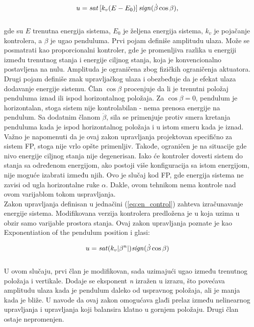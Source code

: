 \documentclass[a4paper,11pt]{article}
\theoremstyle{definition} \newtheorem{deff}{Definicija}[section]
\theoremstyle{definition} \newtheorem{prim}[deff]{Primer}
\theoremstyle{plain} \newtheorem{teor}[deff]{Teorema}
\begin{document}
	\begin{equation}
		u = \text{\textit{sat}}\left[k_v (E - E_0)\right] \text{\textit{sign}}( \dot{\beta} \cos \beta), 
		\label{eq:en_control}
	\end{equation} \\
	
	
	gde su $\textit{E}$ trenutna energija sistema, 
	$\textit{E}_0$ je željena energija sistema, $\textit{k}_v$ je pojačanje kontrolera, a $\beta$ je ugao penduluma. Prvi pojam definiše amplitudu ulaza. Može se posmatrati kao proporcionalni kontroler, gde je promenljiva razlika u energiji između trenutnog stanja i energije ciljnog stanja, koja je konvencionalno postavljena na nulu. Amplituda je ograničena zbog fizičkih ograničenja aktuatora. Drugi pojam definiše znak upravljačkog ulaza i obezbeđuje da je efekat ulaza dodavanje energije sistemu. Član $\cos \beta$ procenjuje da li je trenutni položaj penduluma iznad ili ispod horizontalnog položaja. Za $\cos \beta = 0$, pendulum je horizontalan, stoga sistem nije kontrolabilan - nema prenosa energije na pendulum. Sa dodatnim članom $\dot{\beta}$, sila se primenjuje protiv smera kretanja penduluma kada je ispod horizontalnog položaja i u istom smeru kada je iznad.\\
	
	Važno je napomenuti da je ovaj zakon upravljanja projektovan specifično za sistem FP, stoga nije vrlo opšte primenljiv. Takođe, ograničen je na situacije gde nivo energije ciljnog stanja nije degenerisan. Iako će kontroler dovesti sistem do stanja sa određenom energijom, ako postoji više konfiguracija sa istom energijom, nije moguće izabrati između njih. Ovo je slučaj kod FP, gde energija sistema ne zavisi od ugla horizontalne ruke $\alpha$. Dakle, ovom tehnikom nema kontrole nad ovom varijablom tokom uspravljanja. \\
	
	Zakon upravljanja definisan u jednačini (\ref{eq:en_control}) zahteva izračunavanje energije sistema. Modifikovana verzija kontrolera predložena je u \cite{energy_c} koja uzima u obzir samo varijable prostora stanja. Ovaj zakon upravljanja poznate je kao 
	Exponentiation of the pendulum position i glasi:
	
	\begin{equation}
		u = \text{\textit{sat}}(k_v |\beta^n|) \text{\textit{sign}}( \dot{\beta} \cos \beta)
	\end{equation} \\
	U ovom slučaju, prvi član je modifikovan, sada uzimajući ugao između trenutnog položaja i vertikale.
	Dodaje se eksponent \textit{n} izražen u izrazu, što povećava amplitudu ulaza kada je pendulum daleko od uspravnog položaja, ali je manja kada je bliže. U \cite{inicijalna} navode da ovaj zakon omogućava glađi prelaz između nelinearnog upravljanja i upravljanja koji balansira klatno u gornjem položaju. Drugi član ostaje nepromenjen. \\
	
\end{document}
